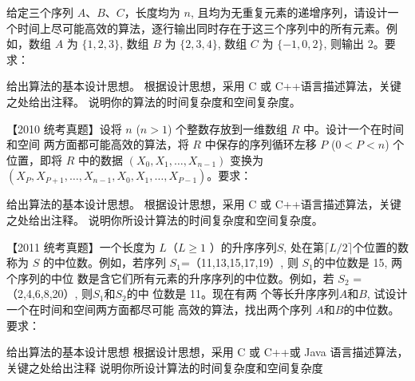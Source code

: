 \begin{qitems}
    \begin{bbox}
        \qitem 给定三个序列 $A、B、C$，长度均为 $n$, 且均为无重复元素的递增序列，请设计一个时间上尽可能高效的算法，逐行输出同时存在于这三个序列中的所有元素。例如，数组 $A$ 为 $\{1,2,3\}$, 数组 $B$ 为 $\{2,3,4\}$, 数组 $C$ 为 $\{-1,0,2\}$, 则输出 $2$。要求：
        \begin{subqitems}
            \subqitem 给出算法的基本设计思想。
            \subqitem 根据设计思想，采用 C 或 C++语言描述算法，关键之处给出注释。
            \subqitem 说明你的算法的时间复杂度和空间复杂度。
        \end{subqitems}
    \end{bbox}

    \begin{bbox}
        \qitem 【2010 统考真题】设将 $n$ ($n>1$) 个整数存放到一维数组 $R$ 中。设计一个在时间和空间
        两方面都可能高效的算法，将 $R$ 中保存的序列循环左移 $P$ ($0<P<n$) 个位置，即将 $R$
        中的数据 $(X_0, X_1, \dots, X_{n-1})$ 变换为 $(X_P, X_{P+1}, \dots, X_{n-1}, X_0, X_1, \dots, X_{P-1})$。要求：
        \begin{subqitems}
            \subqitem 给出算法的基本设计思想。
            \subqitem 根据设计思想，采用 C 或 C++语言描述算法，关键之处给出注释。
            \subqitem 说明你所设计算法的时间复杂度和空间复杂度。
        \end{subqitems}
    \end{bbox}

    \begin{bbox}
        \qitem 【2011 统考真题】一个长度为 $L$（$L\geqslant 1$ ）的升序序列$ S$, 处在第$\lceil L/2\rceil $个位置的数称为 $S$
        的中位数。例如，若序列 $S_1$=（11,13,15,17,19）, 则 $S_1$的中位数是 15, 两个序列的中位
        数是含它们所有元素的升序序列的中位数。例如，若 $S_2$ =（2,4,6,8,20）, 则$S_1$和$S_2$的中
        位数是 11。现在有两 个等长升序序列$A$和$B$, 试设计一个在时间和空间两方面都尽可能
        高效的算法，找出两个序列 $A$和$B$的中位数。要求：
        \begin{subqitems}
            \subqitem 给出算法的基本设计思想
            \subqitem  根据设计思想，采用 C 或 C++或 Java 语言描述算法，关键之处给出注释
            \subqitem 说明你所设计算法的时间复杂度和空间复杂度
        \end{subqitems}
    \end{bbox}


\end{qitems}
